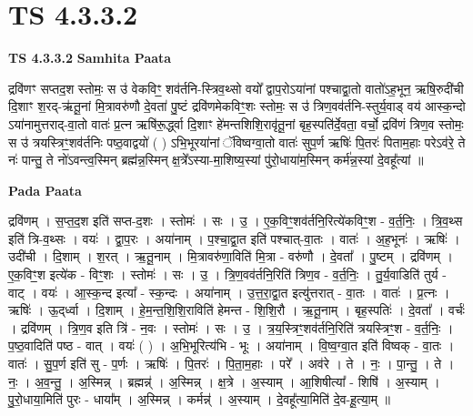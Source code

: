 \documentclass[17pt]{extarticle}
\begin{document}
\section*{ TS 4.3.3.2 }

\textbf{TS 4.3.3.2 } \newline
\textbf{Samhita Paata} \newline

द्रवि॑णꣳ सप्तद॒श स्तोमः॒ स उ॑ वेकविꣳ॒॒ शव॑र्तनि-स्त्रिव॒थ्सो वयो᳚ द्वाप॒रोऽया॑नां पश्चाद्वा॒तो वातो॑ऽह॒भून॒ ऋषि॒रुदी॑ची दि॒शाꣳ श॒रद्-ऋ॑तू॒नां मि॒त्रावरु॑णौ दे॒वता॑ पु॒ष्टं द्रवि॑णमेकविꣳ॒॒शः स्तोमः॒ स उ॑ त्रिण॒वव॑र्तनि-स्तुर्य॒वाड् वय॑ आस्क॒न्दो ऽया॑नामुत्तराद्-वा॒तो वातः॑ प्र॒त्न ऋषि॑रू॒र्द्ध्वा दि॒शाꣳ हे॑मन्तशिशि॒रावृ॑तू॒नां बृह॒स्पति॑र्दे॒वता॒ वर्चो॒ द्रवि॑णं त्रिण॒व स्तोमः॒ स उ॑ त्रयस्त्रिꣳ॒॒शव॑र्तनिः पष्ठ॒वाद्वयो॑ ( ) ऽभि॒भूरया॑नां ॅविष्वग्वा॒तो वातः॑ सुप॒र्ण ऋषिः॑ पि॒तरः॑ पिताम॒हाः परेऽव॑रे॒ ते नः॑ पान्तु॒ ते नो॑ऽवन्त्व॒स्मिन् ब्रह्म॑न्न॒स्मिन् क्ष॒त्रे᳚ऽस्या-मा॒शिष्य॒स्यां पु॑रो॒धाया॑म॒स्मिन् कर्म॑न्न॒स्यां दे॒वहू᳚त्यां ॥ \newline

\textbf{Pada Paata} \newline

द्रवि॑णम् । स॒प्त॒द॒श इति॑ सप्त-द॒शः । स्तोमः॑ । सः । उ॒ । ए॒क॒विꣳ॒॒शव॑र्तनि॒रित्ये॑कविꣳ॒॒श - व॒र्त॒निः॒ । त्रि॒व॒थ्स इति॑ त्रि-व॒थ्सः । वयः॑ । द्वा॒प॒रः । अया॑नाम् । प॒श्चा॒द्वा॒त इति॑ पश्चात्-वा॒तः । वातः॑ । अ॒ह॒भूनः॑ । ऋषिः॑ । उदी॑ची । दि॒शाम् । श॒रत् । ऋ॒तू॒नाम् । मि॒त्रावरु॑णा॒विति॑ मि॒त्रा - वरु॑णौ । दे॒वता᳚ । पु॒ष्टम् । द्रवि॑णम् । ए॒क॒विꣳ॒॒श इत्ये॑क - विꣳ॒॒शः । स्तोमः॑ । सः । उ॒ । त्रि॒ण॒वव॑र्तनि॒रिति॑ त्रिण॒व - व॒र्त॒निः॒ । तु॒र्य॒वाडिति॑ तुर्य - वाट् । वयः॑ । आ॒स्क॒न्द इत्या᳚ - स्क॒न्दः । अया॑नाम् । उ॒त्त॒रा॒द्वा॒त इत्यु॑त्तरात् - वा॒तः । वातः॑ । प्र॒त्नः । ऋषिः॑ । ऊ॒द्‌र्ध्वा । दि॒शाम् । हे॒म॒न्त॒शि॒शि॒राविति॑ हेमन्त - शि॒शि॒रौ । ऋ॒तू॒नाम् । बृह॒स्पतिः॑ । दे॒वता᳚ । वर्चः॑ । द्रवि॑णम् । त्रि॒ण॒व इति त्रि॑ - न॒वः । स्तोमः॑ । सः । उ॒ । त्र॒य॒स्त्रिꣳ॒॒शव॑र्तनि॒रिति॑ त्रयस्त्रिꣳ॒॒श - व॒र्त॒निः॒ । प॒ष्ठ॒वादिति॑ पष्ठ - वात् । वयः॑ ( ) । अ॒भि॒भूरित्य॑भि - भूः । अया॑नाम् । वि॒ष्व॒ग्वा॒त इति॑ विष्वक् - वा॒तः । वातः॑ । सु॒प॒र्ण इति॑ सु - प॒र्णः । ऋषिः॑ । पि॒तरः॑ । पि॒ता॒म॒हाः । परे᳚ । अव॑रे । ते । नः॒ । पा॒न्तु॒ । ते । नः॒ । अ॒व॒न्तु॒ । अ॒स्मिन्न् । ब्रह्मन्न्॑ । अ॒स्मिन्न् । क्ष॒त्रे । अ॒स्याम् । आ॒शिषीत्या᳚ - शिषि॑ । अ॒स्याम् । पु॒रो॒धाया॒मिति॑ पुरः - धाया᳚म् । अ॒स्मिन्न् । कर्मन्न्॑ । अ॒स्याम् । दे॒वहू᳚त्या॒मिति॑ दे॒व-हू॒त्या॒म् ॥  \newline
\end{document}
